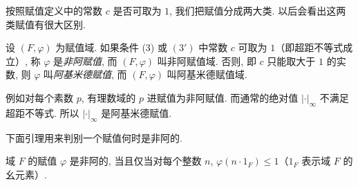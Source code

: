 按照赋值定义中的常数 $c$ 是否可取为 $1$, 我们把赋值分成两大类. 以后会看出这两类赋值有很大区别.

\begin{definition}\label{def:ch7-2}
设 $(F,\varphi)$ 为赋值域. 如果条件 (3) 或 $(3')$ 中常数 $c$ 可取为 $1$（即超距不等式成立）, 称 $\varphi$ 是\emph{非阿赋值}, 而 $(F,\varphi)$ 叫非阿赋值域. 否则, 即 $c$ 只能取大于 $1$ 的实数, 则 $\varphi$ 叫\emph{阿基米德赋值}, 而 $(F,\varphi)$ 叫阿基米德赋值域.
\end{definition}

例如对每个素数 $p$, 有理数域的 $p$ 进赋值为非阿赋值. 而通常的绝对值 $|\cdot|_{\infty}$ 不满足超距不等式. 所以 $|\cdot|_{\infty}$ 是阿基米德赋值.

下面引理用来判别一个赋值何时是非阿的.

\begin{lemma}\label{lem:ch7-2}
域 $F$ 的赋值 $\varphi$ 是非阿的, 当且仅当对每个整数 $n$, $\varphi(n\cdot 1_F)\leqslant 1$（$1_F$ 表示域 $F$ 的幺元素）.
\end{lemma}

